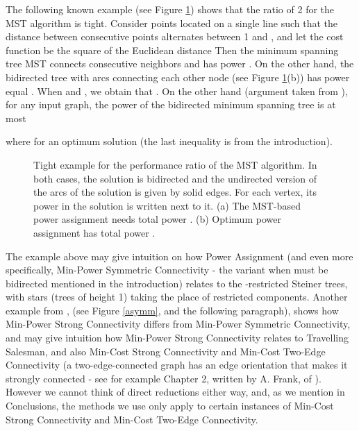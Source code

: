 \documentclass[12pt]{article}
\begin{document}
The following known example (see Figure \ref{f_2mst})
 shows that the ratio of 2 for the MST algorithm is tight.
Consider  points located on a single line such that the distance
between consecutive points alternates between 1 and  ,
and let the cost function  be the square of the Euclidean distance
Then the minimum spanning
tree MST connects consecutive neighbors and has power
.
On the other hand, the bidirected tree  with arcs connecting
each other node (see Figure \ref{f_2mst}(b)) has power equal
. When
 and , we obtain that
.  On the other hand 
(argument taken from \cite{CH89}), for any input graph,
the power of the bidirected minimum spanning tree  is at most

where  for an optimum solution  
(the last inequality is from the introduction).

\begin{figure}
\centerline{} 
\caption{\label{f_2mst}
Tight example for the performance ratio of the MST algorithm.
In both cases, the solution is bidirected and the undirected
version of the arcs of the solution is given by solid edges.
For each vertex, its power in the solution is written next to it.
(a) The MST-based power assignment needs total power .
(b) Optimum power assignment has total power
.
}
\end{figure}

The example above may give intuition on how Power Assignment 
(and even more specifically, Min-Power Symmetric Connectivity
- the variant when  must be bidirected mentioned in the introduction)
relates to the -restricted Steiner trees, with stars
(trees of height 1) taking the place of restricted components. 
Another example  from \cite{ACMPTZ06}, (see Figure \ref{asymm}, and the
following paragraph), shows how Min-Power Strong Connectivity 
differs from Min-Power Symmetric Connectivity, and may give intuition how
Min-Power Strong Connectivity relates to Travelling Salesman, and also
Min-Cost Strong Connectivity and Min-Cost Two-Edge Connectivity
(a two-edge-connected graph has an edge orientation that makes it strongly
connected  - see for example Chapter 2,
written by A. Frank, of \cite{GrahamGL95}).
However we cannot think of direct reductions either way, and,
as we mention in Conclusions, the methods we use
only apply to certain instances of 
Min-Cost Strong Connectivity and Min-Cost Two-Edge Connectivity. 
\end{document}
